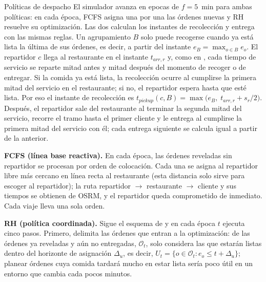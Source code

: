 \documentclass[10pt]{article}
\makeatletter
\renewcommand{\subsection}{\@startsection{subsection}{2}{0pt}{8pt}{0.1pt}
  {\semibold\itshape\fontsize{11}{13.4}\selectfont\addfontfeatures{LetterSpace=6.8}\raggedright}}
\makeatother
\begin{document}
\subsection{Políticas de despacho}
El simulador avanza en epocas de $f = 5$~min para ambas políticas: en cada época, FCFS asigna una por
una las órdenes nuevas y RH resuelve su optimización. Las dos calculan los instantes de recolección y
entrega con las mismas reglas. Un agrupamiento $B$ solo puede recogerse cuando ya está lista la
última de sus órdenes, es decir, a partir del instante $e_B = \max_{o\in B} e_o$. El repartidor $c$
llega al restaurante en el instante $t_{arr,r}$ y, como en \cite{Reyes2018}, cada tiempo de servicio
se reparte mitad antes y mitad después del momento de recoger o de entregar. Si la comida ya está
lista, la recolección ocurre al cumplirse la primera mitad del servicio en el restaurante; si no, el
repartidor espera hasta que esté lista. Por eso el instante de recolección es
$t_{pickup}(c,B) = \max\bigl(e_B,\; t_{arr,r} + s_r/2\bigr)$. Después, el repartidor sale del
restaurante al terminar la segunda mitad del servicio, recorre el tramo hasta el primer cliente y le
entrega al cumplirse la primera mitad del servicio con él; cada entrega siguiente se calcula igual a
partir de la anterior.

\textbf{FCFS (línea base reactiva).} En cada época, las órdenes reveladas sin repartidor se procesan
por orden de colocación. Cada una se asigna al repartidor libre más cercano en línea recta al
restaurante (esta distancia solo sirve para escoger al repartidor); la ruta repartidor $\to$ restaurante
$\to$ cliente y sus tiempos se obtienen de OSRM, y el repartidor queda comprometido de inmediato. Cada
viaje lleva una sola orden.

\textbf{RH (política coordinada).} Sigue el esquema de \cite{Reyes2018} y en cada época $t$ ejecuta
cinco pasos. Primero, delimita las órdenes que entran a la optimización: de las órdenes ya reveladas y
aún no entregadas, $\mathcal{O}_t$, solo considera las que estarán listas dentro del horizonte de
asignación $\Delta_u$, es decir, $U_t = \{o \in \mathcal{O}_t : e_o \leq t + \Delta_u\}$; planear
órdenes cuya comida tardará mucho en estar lista sería poco útil en un entorno que cambia cada pocos
minutos.
\end{document}
